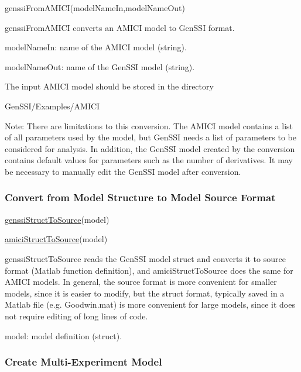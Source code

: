 \begin{DoxyCode}
genssiFromAMICI(modelNameIn,modelNameOut) 
\end{DoxyCode}


genssi\+From\+A\+M\+I\+CI converts an A\+M\+I\+CI model to Gen\+S\+SI format.

model\+Name\+In\+: name of the A\+M\+I\+CI model (string).

model\+Name\+Out\+: name of the Gen\+S\+SI model (string).

The input A\+M\+I\+CI model should be stored in the directory 
\begin{DoxyCode}
GenSSI/Examples/AMICI
\end{DoxyCode}


Note\+: There are limitations to this conversion. The A\+M\+I\+CI model contains a list of all parameters used by the model, but Gen\+S\+SI needs a list of parameters to be considered for analysis. In addition, the Gen\+S\+SI model created by the conversion contains default values for parameters such as the number of derivatives. It may be necessary to manually edit the Gen\+S\+SI model after conversion.\hypertarget{def_simu_structtosource}{}\subsubsection{Convert from Model Structure to Model Source Format}\label{def_simu_structtosource}

\begin{DoxyCode}
\hyperlink{genssi_struct_to_source_8m_a89e0f25ee6214137a181974078dedd04}{genssiStructToSource}(model) 
\end{DoxyCode}



\begin{DoxyCode}
\hyperlink{amici_struct_to_source_8m_a5c714bc9158f2f1899f751a37e0ae827}{amiciStructToSource}(model) 
\end{DoxyCode}


genssi\+Struct\+To\+Source reads the Gen\+S\+SI model struct and converts it to source format (Matlab function definition), and amici\+Struct\+To\+Source does the same for A\+M\+I\+CI models. In general, the source format is more convenient for smaller models, since it is easier to modify, but the struct format, typically saved in a Matlab file (e.\+g. Goodwin.\+mat) is more convenient for large models, since it does not require editing of long lines of code.

model\+: model definition (struct).\hypertarget{def_simu_multiexp}{}\subsubsection{Create Multi-\/\+Experiment Model}\label{def_simu_multiexp}

